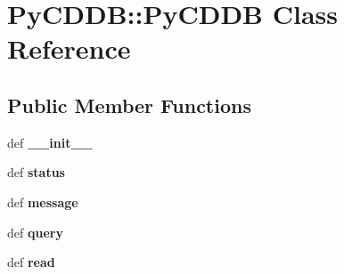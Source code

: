 \hypertarget{classPyCDDB_1_1PyCDDB}{
\section{PyCDDB::PyCDDB Class Reference}
\label{classPyCDDB_1_1PyCDDB}
}
\subsection*{Public Member Functions}
\begin{DoxyCompactItemize}
\item 
\hypertarget{classPyCDDB_1_1PyCDDB_ada3856d7d554f4220bffaa2dc80e2345}{
def {\bfseries \_\-\_\-init\_\-\_\-}}
\label{classPyCDDB_1_1PyCDDB_ada3856d7d554f4220bffaa2dc80e2345}

\item 
\hypertarget{classPyCDDB_1_1PyCDDB_a4f8834c9309b73f9039a2fad216ba6ef}{
def {\bfseries status}}
\label{classPyCDDB_1_1PyCDDB_a4f8834c9309b73f9039a2fad216ba6ef}

\item 
\hypertarget{classPyCDDB_1_1PyCDDB_a890ddefc634f0d90d1fdf7352260ad0c}{
def {\bfseries message}}
\label{classPyCDDB_1_1PyCDDB_a890ddefc634f0d90d1fdf7352260ad0c}

\item 
\hypertarget{classPyCDDB_1_1PyCDDB_a0308bb12b0a45443c07f9bfdbdde8b50}{
def {\bfseries query}}
\label{classPyCDDB_1_1PyCDDB_a0308bb12b0a45443c07f9bfdbdde8b50}

\item 
\hypertarget{classPyCDDB_1_1PyCDDB_ad78b7833ce56d9b221ec4af3d78b6e37}{
def {\bfseries read}}
\label{classPyCDDB_1_1PyCDDB_ad78b7833ce56d9b221ec4af3d78b6e37}

\end{DoxyCompactItemize}
